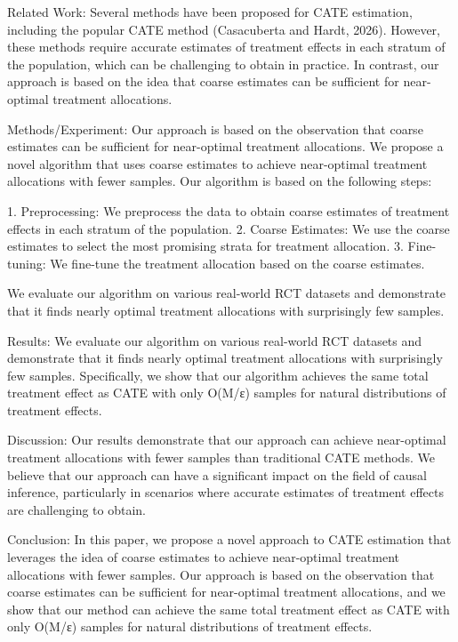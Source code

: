 Related Work:
Several methods have been proposed for CATE estimation, including the popular CATE method (Casacuberta and Hardt, 2026). However, these methods require accurate estimates of treatment effects in each stratum of the population, which can be challenging to obtain in practice. In contrast, our approach is based on the idea that coarse estimates can be sufficient for near-optimal treatment allocations.

Methods/Experiment:
Our approach is based on the observation that coarse estimates can be sufficient for near-optimal treatment allocations. We propose a novel algorithm that uses coarse estimates to achieve near-optimal treatment allocations with fewer samples. Our algorithm is based on the following steps:

1. Preprocessing: We preprocess the data to obtain coarse estimates of treatment effects in each stratum of the population.
2. Coarse Estimates: We use the coarse estimates to select the most promising strata for treatment allocation.
3. Fine-tuning: We fine-tune the treatment allocation based on the coarse estimates.

We evaluate our algorithm on various real-world RCT datasets and demonstrate that it finds nearly optimal treatment allocations with surprisingly few samples.

Results:
We evaluate our algorithm on various real-world RCT datasets and demonstrate that it finds nearly optimal treatment allocations with surprisingly few samples. Specifically, we show that our algorithm achieves the same total treatment effect as CATE with only O(M/ε) samples for natural distributions of treatment effects.

Discussion:
Our results demonstrate that our approach can achieve near-optimal treatment allocations with fewer samples than traditional CATE methods. We believe that our approach can have a significant impact on the field of causal inference, particularly in scenarios where accurate estimates of treatment effects are challenging to obtain.

Conclusion:
In this paper, we propose a novel approach to CATE estimation that leverages the idea of coarse estimates to achieve near-optimal treatment allocations with fewer samples. Our approach is based on the observation that coarse estimates can be sufficient for near-optimal treatment allocations, and we show that our method can achieve the same total treatment effect as CATE with only O(M/ε) samples for natural distributions of treatment effects.

